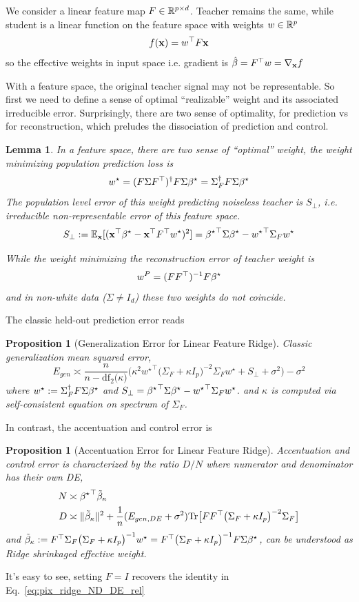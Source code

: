 \documentclass{article}
\providecommand{\propositionname}{Proposition}
\providecommand{\lemmaname}{Lemma}
\theoremstyle{plain}
\newtheorem{prop}[thm]{\propositionname}
\newtheorem{lem}[thm]{\lemmaname}
\theoremstyle{definition}
\begin{document}
We consider a linear feature map $F\in\mathbb{R}^{p \times d}$. Teacher remains the same, while student is a linear function on the feature space with weights $w\in\mathbb{R}^p$
\[
f(\mathbf{x})=w^{\top}F\mathbf{x}
\]
so the effective weights in input space i.e. gradient is $\hat{\beta}=F^{\top}w=\nabla_{\mathbf{x}} f$

With a feature space, the original teacher signal may not be representable.
So first we need to define a sense of optimal ``realizable'' weight
and its associated irreducible error.
Surprisingly, there are two sense of optimality, for prediction vs for reconstruction,
which preludes the dissociation of prediction and control.
\begin{lem}
In a feature space, there are two sense of ``optimal'' weight, the
weight minimizing population prediction loss is
\[
w^{\star}=(F\Sigma F^{\top})^{\dagger}F\Sigma{\beta^{\star}}=\Sigma_{F}^{\dagger}F\Sigma{\beta^{\star}}
\]
The population level error of this weight predicting noiseless teacher
is $S_{\perp}$, i.e. irreducible non-representable error of this
feature space.
\[
S_{\perp}:=\mathbb{E}_{\mathbf{x}}[(\mathbf{x}^{\top}{\beta^{\star}}-\mathbf{x}^{\top}F^{\top}w^{\star})^{2}]={{\beta^{\star}}}^{\top}\Sigma{\beta^{\star}}-{w^\star}^{\top}\Sigma_{F}w^{\star}
\]

While the weight minimizing the reconstruction error of teacher weight
is
\[
w^{P}=(FF^{\top})^{-1}F{\beta^{\star}}
\]
and in non-white data ($\Sigma\neq I_d$) these two weights do not coincide.
\end{lem}
The classic held-out prediction error reads
\begin{prop}[Generalization Error for Linear Feature Ridge]\label{prop:linfeat_gen_err}
Classic generalization mean squared error,
\begin{equation}
E_{gen}\asymp\frac{n}{n-\mathrm{df}_{2}\bigl(\kappa\bigr)}\Big(\kappa^{2}{w^\star}^{\top}\bigl(\Sigma_{F}+\kappa I_{p}\bigr)^{-2}\Sigma_{F}w^{\star}+S_{\perp}+\sigma^{2}\Big)-\sigma^{2}
\end{equation}
where $w^{\star}:=\Sigma_{F}^{\dagger}F\Sigma{\beta^{\star}}$ and $S_{\perp}={{\beta^{\star}}}^{\top}\Sigma{\beta^{\star}}-{w^\star}^{\top}\Sigma_{F}w^{\star}$.
and $\kappa$ is computed via self-consistent equation on spectrum
of $\Sigma_{F}$.
\end{prop}
In contrast, the accentuation and control error is
\begin{prop}[Accentuation Error for Linear Feature Ridge]\label{prop:linfeat_acc_ND}
Accentuation and control error is characterized by the ratio $D/N$
where numerator and denominator has their own DE,
\begin{align}\label{eq:linfeat_ridge_ND_DE_rel}
N & \asymp{{\beta^{\star}}}^{\top}\tilde{\beta}_{\kappa}\\
D & \asymp\|\tilde{\beta}_{\kappa}\|^{2}+\frac{1}{n}(E_{gen,DE}+\sigma^{2})\mbox{Tr}\bigl[FF^{\top}\bigl(\Sigma_{F}+\kappa I_{p}\bigr)^{-2}\Sigma_{F}\bigr]
\end{align}
and $\tilde{\beta}_{\kappa}:=F^{\top}\Sigma_{F}\bigl(\Sigma_{F}+\kappa I_{p}\bigr)^{-1}w^{\star}=F^{\top}\bigl(\Sigma_{F}+\kappa I_{p}\bigr)^{-1}F\Sigma{\beta^{\star}}$,
can be understood as Ridge shrinkaged effective weight.
\end{prop}
It's easy to see, setting $F=I$ recovers the identity in Eq.~\ref{eq:pix_ridge_ND_DE_rel}
\end{document}
